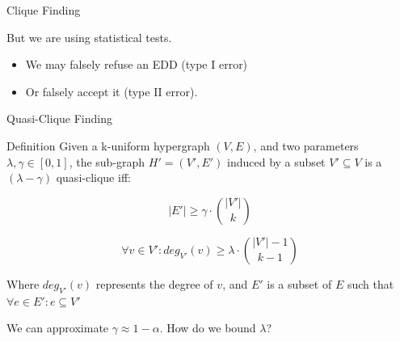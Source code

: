 \documentclass[10pt]{beamer}
\begin{document}
\begin{frame}{Clique Finding}
    \pause
    
    \begin{alertblock}{}
    But we are using statistical tests.
    
    \begin{itemize}
        \item We may falsely refuse an EDD (type I error)
        \item Or falsely accept it (type II error).
    \end{itemize}
    \end{alertblock}
\end{frame}


\begin{frame}{Quasi-Clique Finding}
    \begin{alertblock}{Definition}
    Given a k-uniform hypergraph $(V,E)$, and two parameters $\lambda, \gamma \in [0,1]$,
    the sub-graph $H'=(V',E')$ induced by a subset $V' \subseteq V$ is a
    $(\lambda-\gamma)$ quasi-clique iff:
    
    \begin{equation}
        |E'| \ge \gamma \cdot \binom{|V'|}{k}
        \label{eq:edge_hyperclique}
    \end{equation}
    
    \begin{equation}
        \forall v \in V': deg_{V'}(v) \ge \lambda \cdot \binom{|V'| - 1}{k - 1}
        \label{eq:deg_hyperclique}
    \end{equation}

    Where $deg_{V'}(v)$ represents the degree of $v$, and $E'$ is a subset of $E$ such that
    $\forall e \in E' : e \subseteq V'$
    \end{alertblock}
    
    We can approximate $\gamma \approx 1 - \alpha$. How do we bound $\lambda$?

\end{frame}
\end{document}
